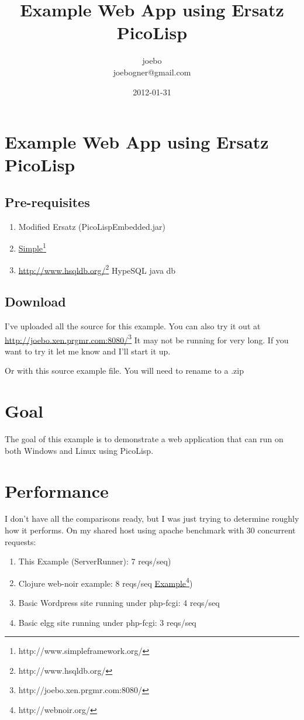 \documentclass[10pt,a4paper]{article}
\title{Example Web App using Ersatz PicoLisp}
\author{joebo\\joebogner@gmail.com}
\date{2012-01-31}
\begin{document}
\maketitle

\section*{Example Web App using Ersatz PicoLisp}

\subsection*{Pre-requisites}
\begin{enumerate}
   \item Modified Ersatz (PicoLispEmbedded.jar)
\item \underline{Simple}\footnote{http://www.simpleframework.org/}
\item \underline{http://www.hsqldb.org/}\footnote{http://www.hsqldb.org/} HypeSQL java db
\end{enumerate}

\subsection*{Download}
I've uploaded all the source for this example. You can also try it out at \underline{http://joebo.xen.prgmr.com:8080/}\footnote{http://joebo.xen.prgmr.com:8080/} It may not be running for very long. If you want to try it let me know and I'll start it up.

Or with this source example file. You will need to rename to a .zip

\section*{Goal}
The goal of this example is to demonstrate a web application that can run on both Windows and Linux using PicoLisp.

\section*{Performance}
I don't have all the comparisons ready, but I was just trying to determine roughly how it performs. On my shared host using apache benchmark with 30 concurrent requests:

\begin{enumerate}
   \item This Example (ServerRunner): 7 reqs/seq)
\item Clojure web-noir example: 8 reqs/seq \underline{Example}\footnote{http://webnoir.org/})
\item Basic Wordpress site running under php-fcgi: 4 reqs/seq
\item Basic elgg site running under php-fcgi: 3 reqs/seq
\end{enumerate}
\end{document}
